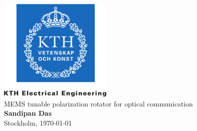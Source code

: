 \documentclass[../report.tex]{subfiles}
\begin{document}
	
    \begin{titlepage}
        \thispagestyle{empty}
        \begin{center}
            \includegraphics[height=5cm]{./Ch0.2-Title/kth_cmyk_info_comm_tech}\\
            \vspace{2.5cm}
            \huge{MEMS tunable polarization rotator for optical communication}\\
            \vspace{4cm}
            \Large{\textbf{Sandipan Das}}\\
            \vspace{4cm}
            \Large{Stockholm, \today}
        \end{center} 
    \end{titlepage}
\end{document}
